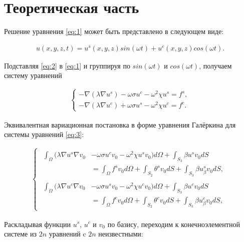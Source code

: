 \documentclass[12pt]{article}
\begin{document}
\section{Теоретическая часть}

\noindent Решение уравнения \ref{eq:1} может быть представлено в следующем виде:

\begin{align}
  \label{eq:2} u(x, y, z, t) = u^s(x, y, z)sin(\omega t) + u^c(x, y, z)cos(\omega t).
\end{align}

\vskip 4mm
\noindent Подставляя \ref{eq:2} в \ref{eq:1} и группируя по $sin(\omega t)$ и $cos(\omega t)$,
  получаем систему уравнений

\begin{align}\label{eq:3}
  \begin{cases}
    -\nabla(\lambda\nabla u^s) - \omega\sigma u^c - \omega^2\chi u^s = f^s, \\
    -\nabla(\lambda\nabla u^c) + \omega\sigma u^s - \omega^2\chi u^c = f^c.
  \end{cases}
\end{align}

\vskip 4mm
\noindent Эквивалентная вариационная постановка в форме уравнения Галёркина для
  системы уравнений \ref{eq:3}:

\begin{align}
  \begin{cases}
    \begin{split}
      \int_{\Omega}(\lambda\nabla u^s \nabla v_0 & - \omega\sigma u^c v_0 - \omega^2\chi u^s v_0) d\Omega +
      \int_{S_3}\beta u^s v_0 dS \\
      & = \int_{\Omega}f^s v_0 d\Omega +
          \int_{S_2}\theta^s v_0 dS +
          \int_{S_3}\beta u^s_{\beta} v_0 dS,
    \end{split} \\
    \begin{split}
      \int_{\Omega}(\lambda\nabla u^c \nabla v_0 & - \omega\sigma u^s v_0 - \omega^2\chi u^c v_0) d\Omega +
      \int_{S_3}\beta u^c v_0 dS \\
      & = \int_{\Omega}f^c v_0 d\Omega +
          \int_{S_2}\theta^c v_0 dS +
          \int_{S_3}\beta u^c_{\beta} v_0 dS,
    \end{split}
  \end{cases}
\end{align}

\vskip 5mm
\noindent Раскладывая функции $u^s$, $u^c$ и $v_0$ по базису, переходим 
к конечноэлементной системе из $2n$ уравнений c $2n$ неизвестными:
\end{document}
